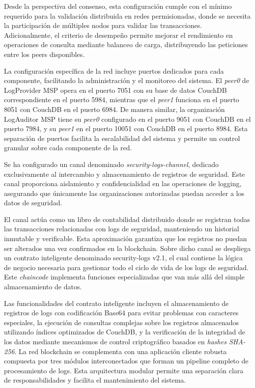 Desde la perspectiva del consenso, esta configuración cumple con el mínimo requerido para la validación distribuida en redes permisionadas, donde se necesita la participación de múltiples nodos para validar las transacciones. Adicionalmente, el criterio de desempeño permite mejorar el rendimiento en operaciones de consulta mediante balanceo de carga, distribuyendo las peticiones entre los peers disponibles.

La configuración específica de la red incluye puertos dedicados para cada componente, facilitando la administración y el monitoreo del sistema. El \textit{peer0} de LogProvider MSP opera en el puerto 7051 con su base de datos CouchDB correspondiente en el puerto 5984, mientras que el \textit{peer1} funciona en el puerto 8051 con CouchDB en el puerto 6984.
De manera similar, la organización LogAuditor MSP tiene su \textit{peer0} configurado en el puerto 9051 con CouchDB en el puerto 7984, y su \textit{peer1} en el puerto 10051 con CouchDB en el puerto 8984. Esta separación de puertos facilita la escalabilidad del sistema y permite un control granular sobre cada componente de la red.

Se ha configurado un canal denominado \textit{security-logs-channel}, dedicado exclusivamente al intercambio y almacenamiento de registros de seguridad. Este canal proporciona aislamiento y confidencialidad en las operaciones de logging, asegurando que únicamente las organizaciones autorizadas puedan acceder a los datos de seguridad.

El canal actúa como un libro de contabilidad distribuido donde se registran todas las transacciones relacionadas con logs de seguridad, manteniendo un historial inmutable y verificable. Esta aproximación garantiza que los registros no puedan ser alterados una vez confirmados en la blockchain.
Sobre dicho canal se despliega un contrato inteligente denominado security-logs v2.1, el cual contiene la lógica de negocio necesaria para gestionar todo el ciclo de vida de los logs de seguridad. Este \textit{chaincode} implementa funciones especializadas que van más allá del simple almacenamiento de datos.

Las funcionalidades del contrato inteligente incluyen el almacenamiento de registros de logs con codificación Base64 para evitar problemas con caracteres especiales, la ejecución de consultas complejas sobre los registros almacenados utilizando índices optimizados de CouchDB, y la verificación de la integridad de los datos mediante mecanismos de control criptográfico basados en \textit{hashes SHA-256}.
La red blockchain se complementa con una aplicación cliente robusta compuesta por tres módulos interconectados que forman un pipeline completo de procesamiento de logs. Esta arquitectura modular permite una separación clara de responsabilidades y facilita el mantenimiento del sistema.

